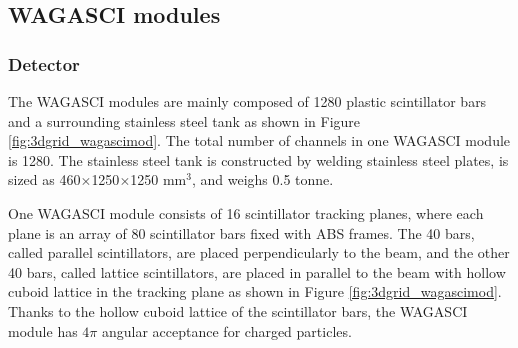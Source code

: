\subsection{WAGASCI modules}
\subsubsection{Detector}
The WAGASCI modules are mainly composed of 1280 plastic scintillator bars and a surrounding stainless steel tank as shown in Figure \ref{fig:3dgrid_wagascimod}.
The total number of channels in one WAGASCI module is 1280.
The stainless steel tank is constructed by welding stainless steel plates, is sized as 460$\times$1250$\times$1250 mm$^{3}$, and weighs 0.5 tonne. 


One WAGASCI module consists of 16 scintillator tracking planes, where each plane is an array of 80 scintillator bars fixed with ABS frames.
The 40 bars, called parallel scintillators, are placed perpendicularly to the beam, and the other 40 bars, called lattice scintillators, are placed in parallel to the beam with hollow cuboid lattice in the tracking plane as shown in Figure \ref{fig:3dgrid_wagascimod}.
Thanks to the hollow cuboid lattice of the scintillator bars, 
the WAGASCI module has $4\pi$ angular acceptance for charged particles.

